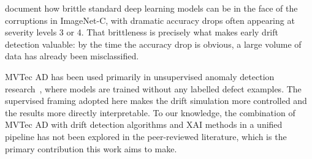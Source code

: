 \textcite{Hendrycks2019} document how brittle standard deep learning models can be in the face of the corruptions in ImageNet-C, with dramatic accuracy drops often appearing at severity levels 3 or 4. That brittleness is precisely what makes early drift detection valuable: by the time the accuracy drop is obvious, a large volume of data has already been misclassified.

MVTec AD has been used primarily in unsupervised anomaly detection research~\autocite{Bergmann2019}, where models are trained without any labelled defect examples. The supervised framing adopted here makes the drift simulation more controlled and the results more directly interpretable. To our knowledge, the combination of MVTec AD with drift detection algorithms and XAI methods in a unified pipeline has not been explored in the peer-reviewed literature, which is the primary contribution this work aims to make.


